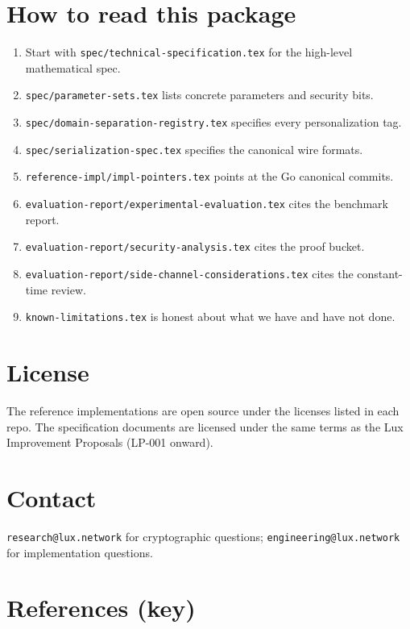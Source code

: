 \documentclass[11pt]{article}
\begin{document}
\section*{How to read this package}

\begin{enumerate}
\item Start with \verb|spec/technical-specification.tex| for the high-level
  mathematical spec.
\item \verb|spec/parameter-sets.tex| lists concrete parameters and security
  bits.
\item \verb|spec/domain-separation-registry.tex| specifies every
  personalization tag.
\item \verb|spec/serialization-spec.tex| specifies the canonical wire
  formats.
\item \verb|reference-impl/impl-pointers.tex| points at the Go canonical
  commits.
\item \verb|evaluation-report/experimental-evaluation.tex| cites the
  benchmark report.
\item \verb|evaluation-report/security-analysis.tex| cites the proof
  bucket.
\item \verb|evaluation-report/side-channel-considerations.tex| cites the
  constant-time review.
\item \verb|known-limitations.tex| is honest about what we have and
  have not done.
\end{enumerate}

\section*{License}

The reference implementations are open source under the licenses listed
in each repo. The specification documents are licensed under the same
terms as the Lux Improvement Proposals (LP-001 onward).

\section*{Contact}

\verb|research@lux.network| for cryptographic questions;
\verb|engineering@lux.network| for implementation questions.

\section*{References (key)}
\end{document}
